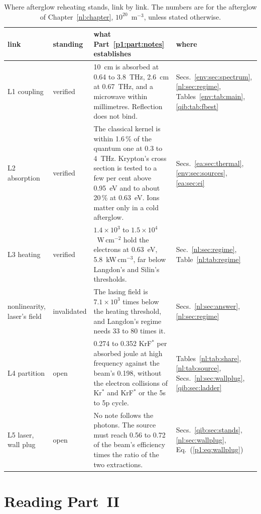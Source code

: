 \begin{table}[t]
\caption{Where afterglow reheating stands, link by link. The numbers are for the
afterglow of Chapter~\ref*{nl:chapter}, $10^{20}$~m$^{-3}$, unless stated otherwise.}
\label{p1:tab:verdict}
\centering
\small
\begin{tabular}{@{}L{1.9cm} L{1.7cm} L{8.4cm} L{3.0cm}@{}}
\toprule
link & standing & what Part~\ref*{p1:part:notes} establishes & where \\
\midrule
L1 coupling & verified & 10~cm is absorbed at 0.64 to 3.8~THz, 2.6~cm at 0.67~THz, and a
microwave within millimetres. Reflection does not bind. & Secs.~\ref*{env:sec:spectrum},
\ref*{nl:sec:regime}, Tables~\ref*{env:tab:main}, \ref*{qib:tab:fbest}\\
\addlinespace
L2 absorption & verified & The classical kernel is within 1.6\,\% of the quantum one at
0.3 to 4~THz. Krypton's cross section is tested to a few per cent above 0.95~eV and to
about 20\,\% at 0.63~eV. Ions matter only in a cold afterglow. &
Secs.~\ref*{ea:sec:thermal}, \ref*{env:sec:sources}, \ref*{ea:sec:ei}\\
\addlinespace
L3 heating & verified & $1.4\times10^{3}$ to $1.5\times10^{4}$~W\,cm$^{-2}$ hold the
electrons at 0.63~eV, 5.8~kW\,cm$^{-3}$, far below Langdon's and Silin's thresholds. &
Sec.~\ref*{nl:sec:regime}, Table~\ref*{nl:tab:regime}\\
\addlinespace
nonlinearity, laser's field & invalidated & The lasing field is $7.1\times10^{3}$ times
below the heating threshold, and Langdon's regime needs 33 to 80 times it. &
Secs.~\ref*{nl:sec:answer}, \ref*{nl:sec:regime}\\
\addlinespace
L4 partition & open & 0.274 to 0.352 KrF$^*$ per absorbed joule at high frequency against
the beam's 0.198, without the electron collisions of Kr$^*$ and KrF$^*$ or the 5s to 5p
cycle. & Tables~\ref*{nl:tab:share}, \ref*{nl:tab:source}, Secs.~\ref*{nl:sec:wallplug},
\ref*{qib:sec:ladder}\\
\addlinespace
L5 laser, wall plug & open & No note follows the photons. The source must reach 0.56 to
0.72 of the beam's efficiency times the ratio of the two extractions. &
Secs.~\ref*{qib:sec:stands}, \ref*{nl:sec:wallplug}, Eq.~(\ref*{p1:eq:wallplug})\\
\bottomrule
\end{tabular}
\end{table}

\section{Reading Part~II}
\label{p1:sec:reading}

